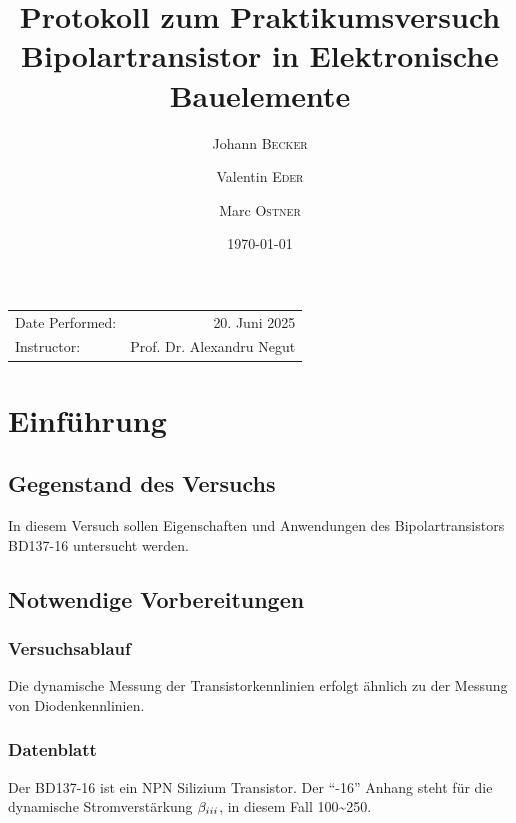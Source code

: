 \documentclass[
	a4paper, %
	12pt, %
]{CSUniSchoolLabReport}
\title{Protokoll zum Praktikumsversuch Bipolartransistor in Elektronische Bauelemente} %
\author{Johann \textsc{Becker} \and Valentin \textsc{Eder} \and Marc \textsc{Ostner}}
\date{\today} %
\newcommand{\RNum}[1]{\uppercase\expandafter{\romannumeral #1\relax}}%
\begin{document}
\maketitle %


\begin{center}
	\begin{tabular}{l r}
		Date Performed: & 20. Juni 2025 \\ %
		
		Instructor: & Prof. Dr. Alexandru Negut %
	\end{tabular}
\end{center}



\section{Einführung}
\subsection{Gegenstand des Versuchs}
In diesem Versuch sollen Eigenschaften und Anwendungen des Bipolartransistors BD137-16 untersucht werden.
\subsection{Notwendige Vorbereitungen}
\subsubsection{Versuchsablauf}
Die dynamische Messung der Transistorkennlinien erfolgt ähnlich zu der Messung von Diodenkennlinien.
\subsubsection{Datenblatt}
Der BD137-16 ist ein NPN Silizium Transistor. 
Der ``-16'' Anhang steht für die dynamische Stromverstärkung $\beta_{\RNum{3}}$, in diesem Fall 100\textasciitilde 250. 
\end{document}

